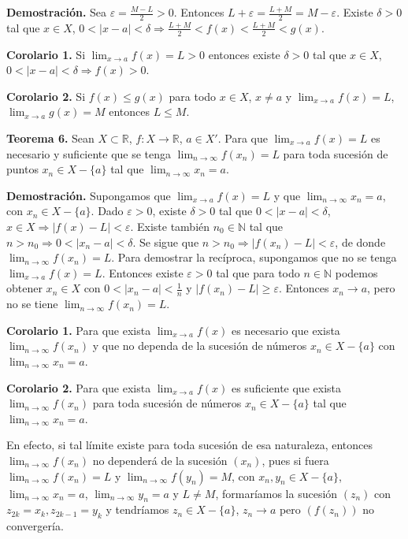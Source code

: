 \documentclass[12pt,oneside]{book}
\begin{document}
\textbf{Demostración.} Sea \(\varepsilon = \frac{M - L}{2} > 0\). Entonces \(L + \varepsilon = \frac{L + M}{2} = M - \varepsilon\). Existe \(\delta > 0\) tal que \(x \in X\), \(0 < |x - a| < \delta \Rightarrow \frac{L + M}{2} < f(x) < \frac{L + M}{2} < g(x)\).

\textbf{Corolario 1.} Si \(\lim_{x \to a} f(x) = L > 0\) entonces existe \(\delta > 0\) tal que \(x \in X\), \(0 < |x - a| < \delta \Rightarrow f(x) > 0\).

\textbf{Corolario 2.} Si \(f(x) \leq g(x)\) para todo \(x \in X\), \(x \neq a\) y \(\lim_{x \to a} f(x) = L\), \(\lim_{x \to a} g(x) = M\) entonces \(L \leq M\).

\textbf{Teorema 6.} Sean \(X \subset \mathbb{R}\), \(f: X \to \mathbb{R}\), \(a \in X'\). Para que \(\lim_{x \to a} f(x) = L\) es necesario y suficiente que se tenga \(\lim_{n \to \infty} f(x_n) = L\) para toda sucesión de puntos \(x_n \in X - \{a\}\) tal que \(\lim_{n \to \infty} x_n = a\).

\textbf{Demostración.} Supongamos que \(\lim_{x \to a} f(x) = L\) y que \(\lim_{n \to \infty} x_n = a\), con \(x_n \in X - \{a\}\). Dado \(\varepsilon > 0\), existe \(\delta > 0\) tal que \(0 < |x - a| < \delta\), \(x \in X \Rightarrow |f(x) - L| < \varepsilon\). Existe también \(n_0 \in \mathbb{N}\) tal que \(n > n_0 \Rightarrow 0 < |x_n - a| < \delta\). Se sigue que \(n > n_0 \Rightarrow |f(x_n) - L| < \varepsilon\), de donde \(\lim_{n \to \infty} f(x_n) = L\). Para demostrar la recíproca, supongamos que no se tenga \(\lim_{x \to a} f(x) = L\). Entonces existe \(\varepsilon > 0\) tal que para todo \(n \in \mathbb{N}\) podemos obtener \(x_n \in X\) con \(0 < |x_n - a| < \frac{1}{n}\) y \(|f(x_n) - L| \geq \varepsilon\). Entonces \(x_n \to a\), pero no se tiene \(\lim_{n \to \infty} f(x_n) = L\).

\textbf{Corolario 1.} Para que exista \(\lim_{x \to a} f(x)\) es necesario que exista \(\lim_{n \to \infty} f(x_n)\) y que no dependa de la sucesión de números \(x_n \in X - \{a\}\) con \(\lim_{n \to \infty} x_n = a\).

\textbf{Corolario 2.} Para que exista \(\lim_{x \to a} f(x)\) es suficiente que exista \(\lim_{n \to \infty} f(x_n)\) para toda sucesión de números \(x_n \in X - \{a\}\) tal que \(\lim_{n \to \infty} x_n = a\).

En efecto, si tal límite existe para toda sucesión de esa naturaleza, entonces \(\lim_{n \to \infty} f(x_n)\) no dependerá de la sucesión \((x_n)\), pues si fuera \(\lim_{n \to \infty} f(x_n) = L\) y \(\lim_{n \to \infty} f(y_n) = M\), con \(x_n, y_n \in X - \{a\}\), \(\lim_{n \to \infty} x_n = a\), \(\lim_{n \to \infty} y_n = a\) y \(L \neq M\), formaríamos la sucesión \((z_n)\) con \(z_{2k} = x_k, z_{2k-1} = y_k\) y tendríamos \(z_n \in X - \{a\}\), \(z_n \to a\) pero \((f(z_n))\) no convergería.
\end{document}
